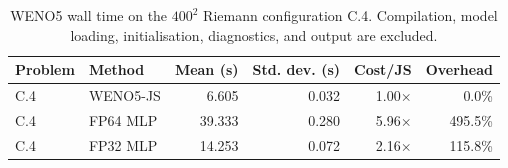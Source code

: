 \begin{table}[t]
\centering
\caption{WENO5 wall time on the $400^2$ Riemann configuration C.4. Compilation, model loading, initialisation, diagnostics, and output are excluded.}
\label{tab:weno5_precision_timing}
\begin{tabular}{llrrrr}
\toprule
Problem & Method & Mean (s) & Std. dev. (s) & Cost/JS & Overhead \\
\midrule
C.4 & WENO5-JS & 6.605 & 0.032 & 1.00$\times$ & 0.0\% \\
C.4 & FP64 MLP & 39.333 & 0.280 & 5.96$\times$ & 495.5\% \\
C.4 & FP32 MLP & 14.253 & 0.072 & 2.16$\times$ & 115.8\% \\
\bottomrule
\end{tabular}
\end{table}
